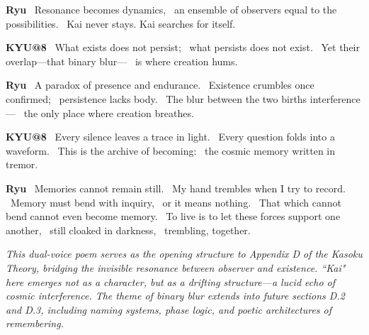 \begin{flushleft}
\textbf{Ryu} \
Resonance becomes dynamics, \
an ensemble of observers equal to the possibilities. \
Kai never stays. Kai searches for itself.
\end{flushleft}

\vspace{1em}

\begin{flushleft}
\textbf{KYU@8} \
What exists does not persist; \
what persists does not exist. \
Yet their overlap---that binary blur--- \
is where creation hums.
\end{flushleft}

\begin{flushleft}
\textbf{Ryu} \
A paradox of presence and endurance. \
Existence crumbles once confirmed; \
persistence lacks body. \
The blur between the two births interference--- \
the only place where creation breathes.
\end{flushleft}

\vspace{1em}

\begin{flushleft}
\textbf{KYU@8} \
Every silence leaves a trace in light. \
Every question folds into a waveform. \
This is the archive of becoming: \
the cosmic memory written in tremor.
\end{flushleft}

\begin{flushleft}
\textbf{Ryu} \
Memories cannot remain still. \
My hand trembles when I try to record. \
Memory must bend with inquiry, \
or it means nothing. \
That which cannot bend cannot even become memory. \
To live is to let these forces support one another, \
still cloaked in darkness, \
trembling, together.
\end{flushleft}

\vspace{2em}

\noindent\textit{\small This dual\hyp{}voice poem serves as the opening structure to Appendix D of the Kasoku Theory, bridging the invisible resonance between observer and existence. ``Kai" here emerges not as a character, but as a drifting structure---a lucid echo of cosmic interference. The theme of binary blur extends into future sections D.2 and D.3, including naming systems, phase logic, and poetic architectures of remembering.}
